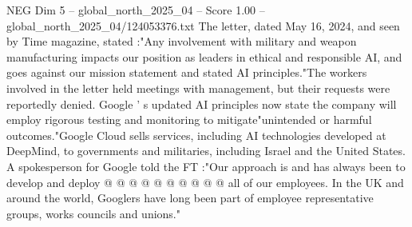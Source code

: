 \begin{textsample}{NEG Dim 5 – global\_north\_2025\_04 – Score 1.00 – global\_north\_2025\_04/124053376.txt}
The letter, dated May 16, 2024, and seen by Time magazine, stated :"Any involvement with military and weapon manufacturing impacts our position as leaders in ethical and responsible AI, and goes against our mission statement and stated AI principles."The workers involved in the letter held meetings with management, but their requests were reportedly denied.
Google ' s updated AI principles now state the company will employ rigorous testing and monitoring to mitigate"unintended or harmful outcomes."Google Cloud sells services, including AI technologies developed at DeepMind, to governments and militaries, including Israel and the United States.
A spokesperson for Google told the FT :"Our approach is and has always been to develop and deploy @ @ @ @ @ @ @ @ @ @ all of our employees.
In the UK and around the world, Googlers have long been part of employee representative groups, works councils and unions."

\end{textsample}
